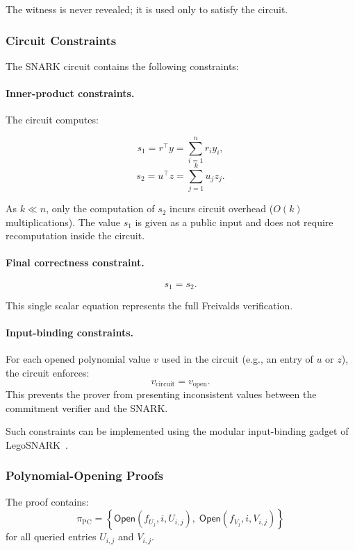\documentclass[11pt]{article}
\begin{document}
The witness is never revealed; it is used only to satisfy the circuit.

\subsubsection{Circuit Constraints}

The SNARK circuit contains the following constraints:

\paragraph{Inner-product constraints.}
The circuit computes:

\[
  s_1 = r^\top y = \sum_{i=1}^n r_i y_i,
\]
\[
  s_2 = u^\top z = \sum_{j=1}^k u_j z_j.
\]

As $k \ll n$, only the computation of $s_2$ incurs circuit overhead
($O(k)$ multiplications).
The value $s_1$ is given as a public input and does not require
recomputation inside the circuit.

\paragraph{Final correctness constraint.}

\[
  s_1 = s_2.
\]

This single scalar equation represents the full Freivalds verification.

\paragraph{Input-binding constraints.}
For each opened polynomial value $v$ used in the circuit (e.g., an entry 
of $u$ or $z$), the circuit enforces:
\[
  v_\text{circuit} = v_\text{open}.
\]
This prevents the prover from presenting inconsistent values between the
commitment verifier and the SNARK.

Such constraints can be implemented using the modular input-binding 
gadget of LegoSNARK~\cite{campanelli2019legosnark}.

\subsubsection{Polynomial-Opening Proofs}

The proof contains:
\[
  \pi_{\mathrm{PC}} = 
    \left\{
      \mathsf{Open}(f_{U_j}, i, U_{i,j}),
      \;
      \mathsf{Open}(f_{V_j}, i, V_{i,j})
    \right\}
\]
for all queried entries $U_{i,j}$ and $V_{i,j}$.
\end{document}
